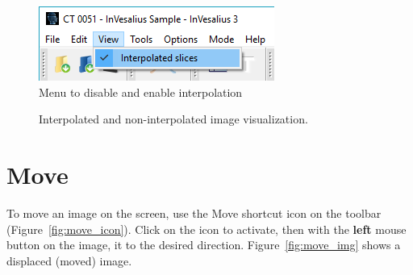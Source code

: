 \begin{figure}[!htb]
\centering
\includegraphics[scale=0.7]{../user_guide_figures/invesalius_screen/menu_interpoleted_image_en.png}
\caption{Menu to disable and enable interpolation}
\label{fig:menu_interpoleted_image_pt}
\end{figure}


\begin{figure}[!htb]
  \centering
    \qquad
  \hfill
  \caption{Interpolated and non-interpolated image visualization.}
  \label{fig:interp}
\end{figure}

\section{Move}

To move an image on the screen, use the Move shortcut icon on the toolbar (Figure~\ref{fig:move_icon}). Click on the icon to activate, then with the \textbf{left} mouse button on the image,  it to the desired direction. Figure~\ref{fig:move_img} shows a displaced (moved) image.

